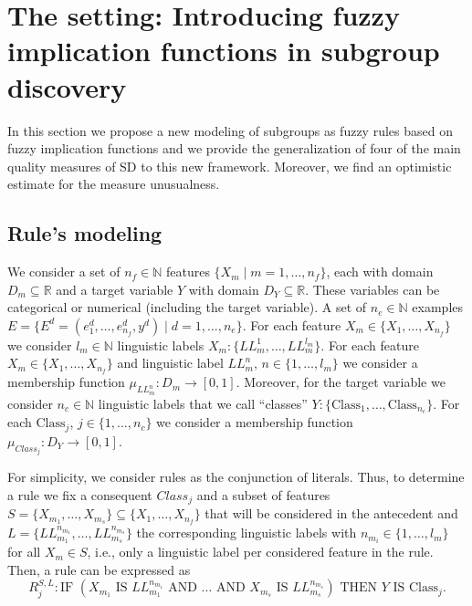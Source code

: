 \section{The setting: Introducing fuzzy implication functions in subgroup discovery}\label{section:setting}

In this section we propose a new modeling of subgroups as fuzzy rules based on fuzzy implication functions and we provide the generalization of four of the main quality measures of SD to this new framework. Moreover, we find an optimistic estimate for the measure unusualness.

\subsection{Rule's modeling}\label{subsection:rules_modeling}

We consider a set of $n_f \in \mathbb{N}$ features $ \{X_m \mid m=1,\dots,n_f\}$, each with domain $D_m \subseteq \mathbb{R}$ and a target variable $Y$ with domain $D_Y \subseteq \mathbb{R}$. These variables can be categorical or numerical (including the target variable). A set of $n_e \in \mathbb{N}$ examples  $E=\{E^d = (e_1^d, \dots, e_{n_f}^d,y^d) \mid d=1,\dots,n_e\}$.
For each feature $X_m \in \{X_1,\dots,X_{n_f}\}$ we consider $l_m \in \mathbb{N}$ linguistic labels
$X_m: \{LL_m^1, \dots, LL_m^{l_m}\}$.
For each feature $X_m \in \{X_1,\dots,X_{n_f}\}$ and linguistic label $LL_{m}^n$, $n \in \{1,\dots,l_m\}$  we consider a membership function $\mu_{LL_{m}^n}:D_m \to [0,1]$. Moreover, for the target variable we consider $n_c \in \mathbb{N}$ linguistic labels that we call ``classes''
$Y:\{\text{Class}_1, \dots, \text{Class}_{n_c}\}$.
For each $\text{Class}_j$, $j \in \{1,\dots,n_c\}$ we consider a membership function $\mu_{Class_j}:D_Y \to [0,1]$.

For simplicity, we consider rules as the conjunction of literals. Thus, to determine a rule we fix a consequent $Class_j$ and a subset of features $S=\{X_{m_1},\dots,X_{m_s}\} \subseteq \{X_1,\dots,X_{n_f}\}$ that will be considered in the antecedent and $L=\{LL^{n_{m_1}}_{m_1},\dots, LL^{n_{m_s}}_{m_s}\}$ the corresponding linguistic labels  with $n_{m_i} \in \{1,\dots,l_m\}$ for all $X_m \in S$, i.e., only a linguistic label per considered feature in the rule. Then, a rule can be expressed as
\begin{equation}\label{eq:GenericLinguisticRule}
	R^{S,L}_j : \text{IF } (X_{m_1} \text{ IS } LL_{m_1}^{n_{m_1}} \text{ AND } \dots  \text{ AND } X_{m_s} \text{ IS } LL_{m_s}^{n_{m_s}}) \text{ THEN } Y \text{ IS } \text{Class}_j.
\end{equation}

